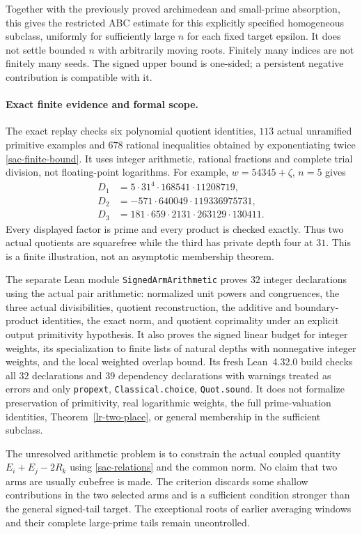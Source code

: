 Together with the previously proved archimedean and small-prime
absorption, this gives the restricted ABC estimate for this explicitly
specified homogeneous subclass, uniformly for sufficiently large $n$
for each fixed target epsilon. It does not settle bounded $n$ with
arbitrarily moving roots. Finitely many indices are not finitely many
seeds. The signed upper bound is one-sided; a persistent negative
contribution is compatible with it.

\paragraph{Exact finite evidence and formal scope.}
The exact replay checks six polynomial quotient identities, $113$
actual unramified primitive examples and $678$ rational inequalities
obtained by exponentiating twice \eqref{sac-finite-bound}. It uses
integer arithmetic, rational fractions and complete trial division,
not floating-point logarithms. For example, $w=54345+\zeta$, $n=5$ gives
\begin{align*}
 D_1&=5\cdot31^4\cdot168541\cdot11208719,\\
 D_2&=-571\cdot640049\cdot119336975731,\\
 D_3&=181\cdot659\cdot2131\cdot263129\cdot130411.
\end{align*}
Every displayed factor is prime and every product is checked exactly.
Thus two actual quotients are squarefree while the third has private
depth four at $31$. This is a finite illustration, not an asymptotic
membership theorem.

The separate Lean module \texttt{SignedArmArithmetic} proves $32$
integer declarations using the actual pair arithmetic: normalized
unit powers and congruences, the three actual divisibilities,
quotient reconstruction, the additive and boundary-product identities,
the exact norm, and quotient coprimality under an explicit output
primitivity hypothesis. It also proves the signed linear budget for
integer weights, its specialization to finite lists of natural depths
with nonnegative integer weights, and the local weighted overlap bound.
Its fresh Lean~4.32.0 build checks all $32$ declarations and $39$
dependency declarations with warnings treated as errors and only
\texttt{propext}, \texttt{Classical.choice}, \texttt{Quot.sound}.
It does not formalize preservation of primitivity, real logarithmic
weights, the full prime-valuation identities, Theorem~\ref{lr-two-place},
or general membership in the sufficient subclass.

The unresolved arithmetic problem is to constrain the actual coupled
quantity $E_i+E_j-2R_k$ using \eqref{sac-relations} and the common norm.
No claim that two arms are usually cubefree is made. The criterion
discards some shallow contributions in the two selected arms and is a
sufficient condition stronger than the general signed-tail target.
The exceptional roots of earlier averaging windows and their complete
large-prime tails remain uncontrolled.
